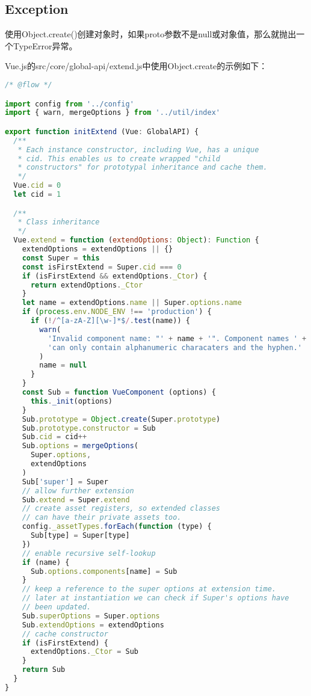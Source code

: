 \subsection{Exception}

使用Object.create()创建对象时，如果proto参数不是null或对象值，那么就抛出一个TypeError异常。



Vue.js的src/core/global-api/extend.js中使用Object.create的示例如下：




\begin{lstlisting}[language=JavaScript]
/* @flow */

import config from '../config'
import { warn, mergeOptions } from '../util/index'

export function initExtend (Vue: GlobalAPI) {
  /**
   * Each instance constructor, including Vue, has a unique
   * cid. This enables us to create wrapped "child
   * constructors" for prototypal inheritance and cache them.
   */
  Vue.cid = 0
  let cid = 1

  /**
   * Class inheritance
   */
  Vue.extend = function (extendOptions: Object): Function {
    extendOptions = extendOptions || {}
    const Super = this
    const isFirstExtend = Super.cid === 0
    if (isFirstExtend && extendOptions._Ctor) {
      return extendOptions._Ctor
    }
    let name = extendOptions.name || Super.options.name
    if (process.env.NODE_ENV !== 'production') {
      if (!/^[a-zA-Z][\w-]*$/.test(name)) {
        warn(
          'Invalid component name: "' + name + '". Component names ' +
          'can only contain alphanumeric characaters and the hyphen.'
        )
        name = null
      }
    }
    const Sub = function VueComponent (options) {
      this._init(options)
    }
    Sub.prototype = Object.create(Super.prototype)
    Sub.prototype.constructor = Sub
    Sub.cid = cid++
    Sub.options = mergeOptions(
      Super.options,
      extendOptions
    )
    Sub['super'] = Super
    // allow further extension
    Sub.extend = Super.extend
    // create asset registers, so extended classes
    // can have their private assets too.
    config._assetTypes.forEach(function (type) {
      Sub[type] = Super[type]
    })
    // enable recursive self-lookup
    if (name) {
      Sub.options.components[name] = Sub
    }
    // keep a reference to the super options at extension time.
    // later at instantiation we can check if Super's options have
    // been updated.
    Sub.superOptions = Super.options
    Sub.extendOptions = extendOptions
    // cache constructor
    if (isFirstExtend) {
      extendOptions._Ctor = Sub
    }
    return Sub
  }
}
\end{lstlisting}


